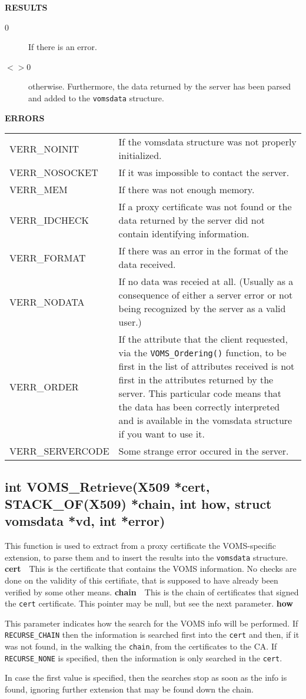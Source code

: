 \documentclass[a4paper]{book}
\newcommand{\errors}{\noindent \textbf{ERRORS}\newline}
\newcommand{\result}{\noindent \textbf{RESULTS}\newline}
\newcommand{\parameter}[1]{\newline\textbf{#1}\ \ }
\begin{document}
\result
\begin{description}
\item[0] If there is an error.
\item[$<>$0] otherwise.  Furthermore, the data returned by the server
  has been parsed and added to the \verb|vomsdata| structure.
\end{description}

\errors
\bigskip\begin{tabular}{lp{3in}}
VERR\_NOINIT   & If the vomsdata structure was not properly
initialized.\\
VERR\_NOSOCKET & If it was impossible to contact the server.\\
VERR\_MEM      & If there was not enough memory.\\
VERR\_IDCHECK  & If a proxy certificate was not found or the data
returned by the server did not contain identifying information.\\
VERR\_FORMAT   & If there was an error in the format of the data
received.\\
VERR\_NODATA   & If no data was receied at all. (Usually as a
consequence of either a server error or not being recognized by the
server as a valid user.)\\
VERR\_ORDER    & If the attribute that the client requested, via the
\verb|VOMS_Ordering()| function, to be first in the list of attributes
received is not first in the attributes returned by the server. This
particular code means that the data has been correctly interpreted and
is available in the vomsdata structure if you want to use it.\\
VERR\_SERVERCODE & Some strange error occured in the server.\\
\end{tabular}


\subsection{int VOMS\_Retrieve(X509 *cert, STACK\_OF(X509) *chain, int how, struct vomsdata *vd, int *error)}

This function is used to extract from a proxy certificate the
VOMS-specific extension, to parse them and to insert the results into
the \verb|vomsdata| structure.
\parameter{cert}{This is the certificate that contains the VOMS
  information.  No checks are done on the validity of this certifiate,
  that is supposed to have already been verified by some other means.}
\parameter{chain}{This is the chain of certificates that signed the
  \verb|cert| certificate.  This pointer may be null, but see the next
  parameter.}
\parameter{how}{This parameter indicates how the search for the VOMS
  info will be performed.  If \verb|RECURSE_CHAIN| then the
  information is searched first into the \verb|cert| and then, if it
  was not found, in the walking the \verb|chain|, from the
  certificates to the CA.  If \verb|RECURSE_NONE| is specified, then
  the information is only searched in the \verb|cert|.

  In case the first value is specified, then the searches stop as soon
  as the info is found, ignoring further extension that may be found
  down the chain.}
\end{document}
